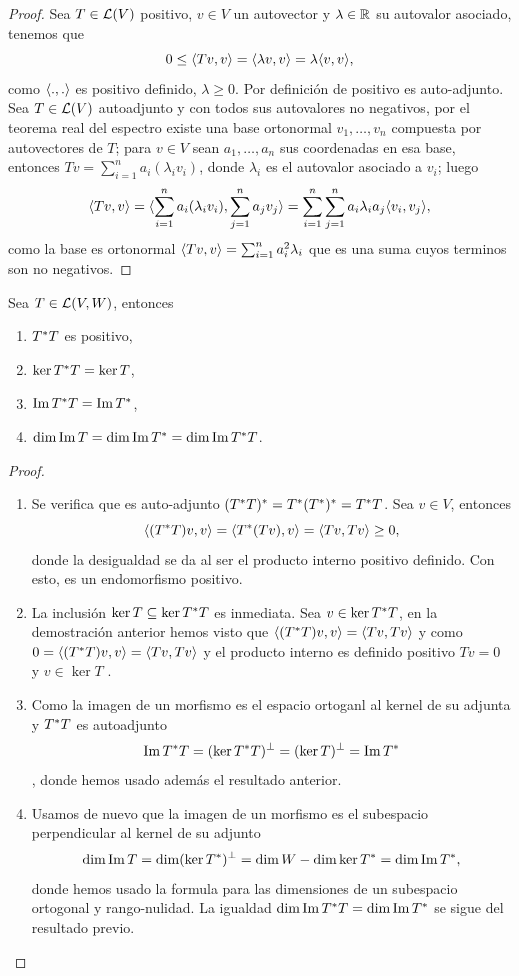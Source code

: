 \begin{proof}
	Sea $T\in\mathcal{L}(V)$ positivo, $v\in V$ un autovector y $\lambda\in \mathbb{R}$ su autovalor asociado, tenemos que \[
		0\leq \langle Tv,v\rangle=\langle\lambda v,v \rangle=\lambda \langle v,v\rangle,
	\]
	como $\langle.,.\rangle$ es positivo definido, $\lambda\geq 0$. Por definición de positivo es auto-adjunto.\\
	Sea $T\in\mathcal{L}(V)$ autoadjunto y con todos sus autovalores no negativos, por el teorema real del espectro existe una base ortonormal $v_1,\ldots,v_n$ compuesta por autovectores de $T$; para $v\in V$ sean $a_1,\ldots,a_n$ sus coordenadas en esa base, entonces $Tv=\sum_{i=1}^n a_i(\lambda_i v_i)$, donde $\lambda_i$ es el autovalor asociado a $v_i$; luego \[
		\langle Tv, v\rangle=\langle\sum_{i=1}^n a_i(\lambda_i v_i),\sum_{j=1}^n a_jv_j\rangle=\sum_{i=1}^n\sum_{j=1}^n a_i\lambda_i a_j \langle v_i,v_j\rangle,
	\] como la base es ortonormal $\langle Tv,v\rangle=\sum_{i=1}^n a_i^2 \lambda_i$ que es una suma cuyos terminos son no negativos.
\end{proof}
\begin{proposition}\label{prop:relación_con_endomorfismo_inducido}
	Sea $T\in \mathcal{L}(V,W)$, entonces
	\begin{enumerate}
		\item $T^{\ast} T$ es positivo,
		\item $\ker T^{\ast} T=\ker T$,
		\item $\operatorname{Im} T^{\ast} T =\operatorname{Im} T^{\ast}$,
		\item $\dim \operatorname{Im} T=\dim \operatorname{Im} T^{\ast}=\dim \operatorname{Im} T^{\ast} T$.
	\end{enumerate}
\end{proposition}
\begin{proof}
	\leavevmode
	\begin{enumerate}
		\item Se verifica que es auto-adjunto $(T^{\ast} T)^{\ast}=T^{\ast}(T^{\ast})^{\ast}=T^{\ast} T$. Sea $v\in V$, entonces \[
			      \langle(T^{\ast} T)v,v\rangle=\langle T^{\ast} (Tv),v\rangle=\langle Tv, Tv\rangle \geq 0,
		      \] donde la desigualdad se da al ser el producto interno positivo definido. Con esto, es un endomorfismo positivo.
		\item La inclusión $\ker T \subseteq \ker T^{\ast} T$ es inmediata. Sea $v\in \ker T^{\ast} T$, en la demostración anterior hemos visto que $\langle(T^{\ast} T)v,v\rangle=\langle Tv,Tv\rangle$ y como $0=\langle(T^{\ast} T)v,v\rangle=\langle Tv,Tv\rangle$ y el producto interno es definido positivo $Tv=0$ y $v\in \ker T$ .
		\item Como la imagen de un morfismo es el espacio ortoganl al kernel de su adjunta y $T^{\ast} T$ es autoadjunto \[
			      \operatorname{Im} T^{\ast} T =(\ker T^{\ast} T)^\perp=(\ker T)^\perp=\operatorname{Im} T^{\ast}
		      \], donde hemos usado además el resultado anterior.
		\item Usamos de nuevo que la imagen de un morfismo es el subespacio perpendicular al kernel de su adjunto \[
			      \dim \operatorname{Im} T=\dim(\ker T^{\ast})^\perp=\dim W- \dim \ker T^{\ast}=\dim\operatorname{Im} T^{\ast},
		      \] donde hemos usado la formula para las dimensiones de un subespacio ortogonal y rango-nulidad. La igualdad $\dim\operatorname{Im} T^{\ast} T =\dim\operatorname{Im} T^{\ast}$ se sigue del resultado previo.
	\end{enumerate}
\end{proof}
